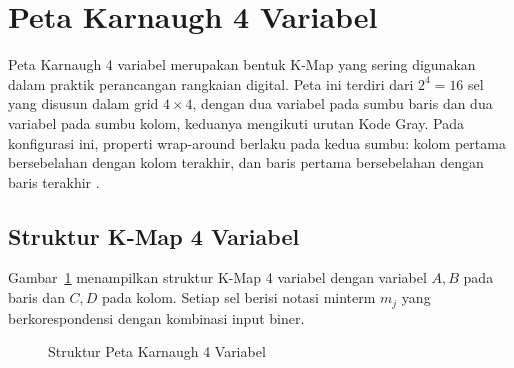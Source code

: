 \section{Peta Karnaugh 4 Variabel}

Peta Karnaugh 4 variabel merupakan bentuk K-Map yang sering digunakan dalam praktik perancangan rangkaian digital. Peta ini terdiri dari $2^4 = 16$ sel yang disusun dalam grid $4 \times 4$, dengan dua variabel pada sumbu baris dan dua variabel pada sumbu kolom, keduanya mengikuti urutan Kode Gray. Pada konfigurasi ini, properti wrap-around berlaku pada kedua sumbu: kolom pertama bersebelahan dengan kolom terakhir, dan baris pertama bersebelahan dengan baris terakhir \cite{rosen2019}.

\subsection{Struktur K-Map 4 Variabel}

Gambar~\ref{fig:kmap-4var} menampilkan struktur K-Map 4 variabel dengan variabel $A, B$ pada baris dan $C, D$ pada kolom. Setiap sel berisi notasi minterm $m_j$ yang berkorespondensi dengan kombinasi input biner.

\begin{figure}[H]
\centering
{}
\caption{Struktur Peta Karnaugh 4 Variabel}
\label{fig:kmap-4var}
\end{figure}

